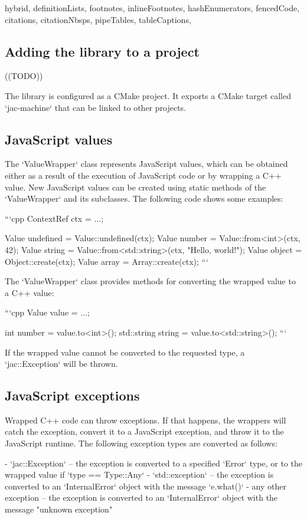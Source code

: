 \begin{markdown*}{%
  hybrid,
  definitionLists,
  footnotes,
  inlineFootnotes,
  hashEnumerators,
  fencedCode,
  citations,
  citationNbsps,
  pipeTables,
  tableCaptions,
}
\subsection{Adding the library to a project}

((TODO))

The library is configured as a CMake project. It exports a CMake target called `jac-machine` that can be linked to other projects.

\subsection{JavaScript values}

The `ValueWrapper` class represents JavaScript values, which can be obtained either as a result of the execution of JavaScript code or by wrapping a C++ value. New JavaScript values can be created using static methods of the `ValueWrapper` and its subclasses. The following code shows some examples:

```cpp
ContextRef ctx = ...;

Value undefined = Value::undefined(ctx);
Value number = Value::from<int>(ctx, 42);
Value string = Value::from<std::string>(ctx, "Hello, world!");
Value object = Object::create(ctx);
Value array = Array::create(ctx);
```

The `ValueWrapper` class provides methods for converting the wrapped value to a C++ value:

```cpp
Value value = ...;

int number = value.to<int>();
std::string string = value.to<std::string>();
```

If the wrapped value cannot be converted to the requested type, a `jac::Exception` will be thrown.

\subsection{JavaScript exceptions}

Wrapped C++ code can throw exceptions. If that happens, the wrappers will catch the exception, convert it to a JavaScript exception, and throw it to the JavaScript runtime. The following exception types are converted as follows:

  - `jac::Exception` -- the exception is converted to a specified `Error` type, or to the wrapped value if `type == Type::Any`
  - `std::exception` -- the exception is converted to an `InternalError` object with the message `e.what()`
  - any other exception -- the exception is converted to an `InternalError` object with the message "unknown exception"


\end{markdown*}
